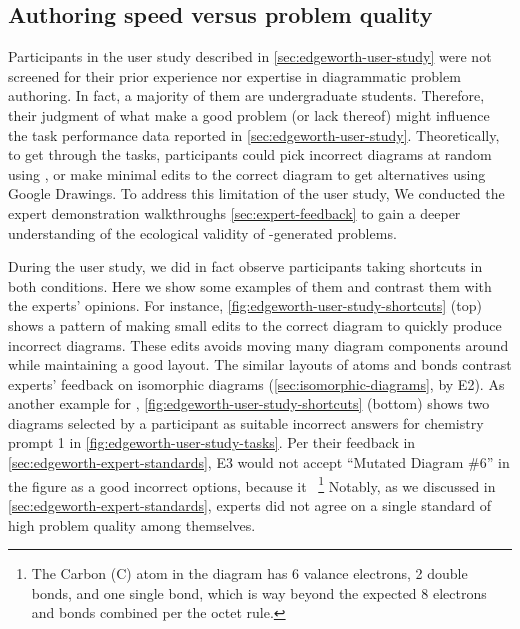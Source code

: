 \subsection{Authoring speed versus problem quality}

Participants in the user study described in \cref{sec:edgeworth-user-study} were not screened for their prior experience nor expertise in diagrammatic problem authoring. In fact, a majority of them are undergraduate students. Therefore, their judgment of what make a good problem (or lack thereof) might influence the task performance data reported in \cref{sec:edgeworth-user-study}. Theoretically, to get through the tasks, participants could pick incorrect diagrams at random using \Edgeworth, or make minimal edits to the correct diagram to get alternatives using Google Drawings. To address this limitation of the user study, We conducted the expert demonstration walkthroughs \cref{sec:expert-feedback} to gain a deeper understanding of the ecological validity of \Edgeworth-generated problems.

During the user study, we did in fact observe participants taking shortcuts in both conditions. Here we show some examples of them and contrast them with the experts' opinions. For instance, \cref{fig:edgeworth-user-study-shortcuts} (top) shows a pattern of making small edits to the correct diagram to quickly produce incorrect diagrams. These edits avoids moving many diagram components around while maintaining a good layout. The similar layouts of atoms and bonds contrast experts' feedback on isomorphic diagrams (\cref{sec:isomorphic-diagrams}, \eg {} by E2). As another example for \Edgeworth, \cref{fig:edgeworth-user-study-shortcuts} (bottom) shows two diagrams selected by a participant as suitable incorrect answers for chemistry prompt 1 in \cref{fig:edgeworth-user-study-tasks}. Per their feedback in \cref{sec:edgeworth-expert-standards}, E3 would not accept ``Mutated Diagram \#6'' in the figure as a good incorrect options, because it ~\footnote{The Carbon (C) atom in the diagram has 6 valance electrons, 2 double bonds, and one single bond, which is way beyond the expected 8 electrons and bonds combined per the octet rule.} Notably, as we discussed in \cref{sec:edgeworth-expert-standards}, experts did not agree on a single standard of high problem quality among themselves. 

